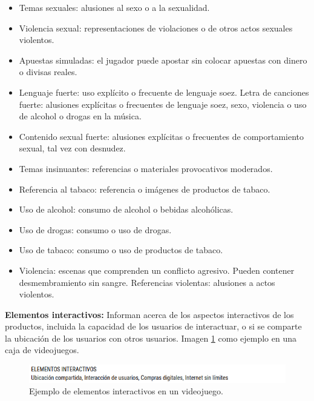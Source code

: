 \begin{itemize}
				\item Temas sexuales: alusiones al sexo o a la sexualidad.
				\item Violencia sexual: representaciones de violaciones o de otros actos sexuales violentos.
				\item Apuestas simuladas: el jugador puede apostar sin colocar apuestas con dinero o divisas reales.
				\item Lenguaje fuerte: uso explícito o frecuente de lenguaje soez.
				Letra de canciones fuerte: alusiones explícitas o frecuentes de lenguaje soez, sexo, violencia o uso de alcohol o drogas en la música.
				\item Contenido sexual fuerte: alusiones explícitas o frecuentes de comportamiento sexual, tal vez con desnudez.
				\item Temas insinuantes: referencias o materiales provocativos moderados.
				\item Referencia al tabaco: referencia o imágenes de productos de tabaco.
				\item Uso de alcohol: consumo de alcohol o bebidas alcohólicas.
				\item Uso de drogas: consumo o uso de drogas.
				\item Uso de tabaco: consumo o uso de productos de tabaco.
				\item Violencia: escenas que comprenden un conflicto agresivo. Pueden contener desmembramiento sin sangre.
				Referencias violentas: alusiones a actos violentos.
			\end{itemize}
			
			\textbf{Elementos interactivos: } 
			Informan acerca de los aspectos interactivos de los productos, incluida la capacidad de los usuarios de interactuar, o si se comparte la ubicación de los usuarios con otros usuarios. Imagen \ref{fig:clasInt} como ejemplo en una caja de videojuegos. 
			\\[1pt]
			
				\begin{figure}
				\centering
				\includegraphics[width=\textwidth]{03MarcoTeorico/imageR/clasInt}
				\caption{Ejemplo de elementos interactivos en un videojuego.}
				\label{fig:clasInt}
			\end{figure}
			
